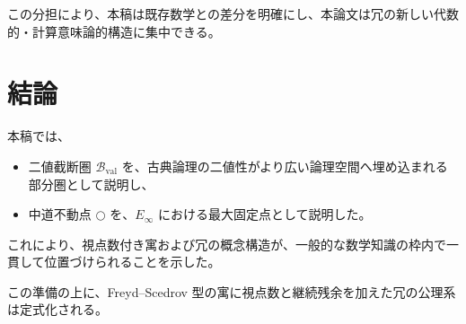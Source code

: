 \documentclass[a4paper,11pt]{article}
\newcommand{\dfix}{\bigcirc}
\begin{document}
この分担により、本稿は既存数学との差分を明確にし、本論文は冗の新しい代数的・計算意味論的構造に集中できる。

\section{結論}
本稿では、
\begin{itemize}
\item 二値截断圏 $\mathcal{B}_{\mathrm{val}}$ を、古典論理の二値性がより広い論理空間へ埋め込まれる部分圏として説明し、
\item 中道不動点 $\dfix$ を、$E_\infty$ における最大固定点として説明した。
\end{itemize}
これにより、視点数付き寓および冗の概念構造が、一般的な数学知識の枠内で一貫して位置づけられることを示した。

この準備の上に、Freyd--Scedrov 型の寓に視点数と継続残余を加えた冗の公理系は定式化される。
\end{document}
